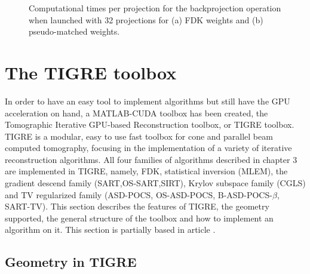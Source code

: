 \begin{figure}
\centering
{}

\caption{\label{fig:backprojection32times} Computational times per projection for the backprojection operation when launched with 32 projections for (a) FDK weights and (b) pseudo-matched weights.} 
\end{figure}


\FloatBarrier
\section{The TIGRE toolbox}

In order to have an easy tool to implement algorithms but still have the GPU acceleration on hand, a MATLAB-CUDA toolbox has been created, the Tomographic Iterative GPU-based Reconstruction toolbox, or TIGRE toolbox. TIGRE is a modular, easy to use fast toolbox for cone and parallel beam computed tomography, focusing in the implementation of a variety of iterative reconstruction algorithms. All four families of algorithms described in chapter 3 are implemented in TIGRE, namely, FDK, statistical inversion (MLEM), the gradient descend family (SART,OS-SART,SIRT), Krylov subspace family (CGLS) and TV regularized family (\mbox{ASD-POCS},  \mbox{OS-ASD-POCS}, \mbox{B-ASD-POCS-$\beta$}, SART-TV). This section describes the features of TIGRE, the geometry supported, the general structure of the toolbox and how to implement an algorithm on it. This section is partially based in article \cite{TIGRE}.

\subsection{Geometry in TIGRE}

